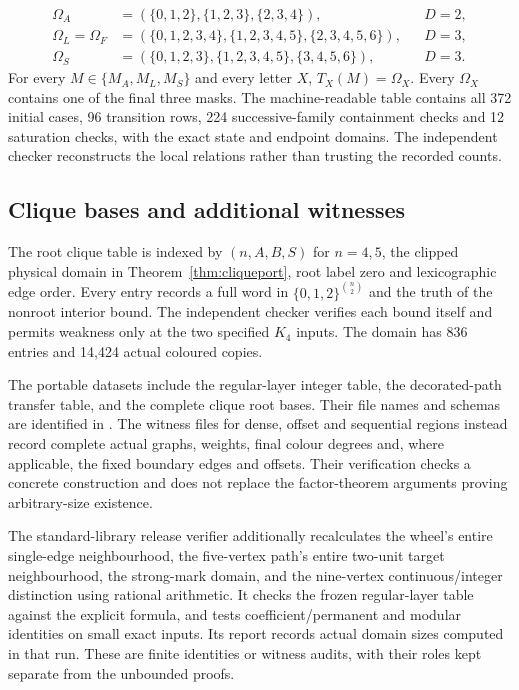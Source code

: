 \begin{align*}
 \Omega_A&=(\{0,1,2\},\{1,2,3\},\{2,3,4\}),&&D=2,\\
 \Omega_L=\Omega_F&=(\{0,1,2,3,4\},\{1,2,3,4,5\},\{2,3,4,5,6\}),&&D=3,\\
 \Omega_S&=(\{0,1,2,3\},\{1,2,3,4,5\},\{3,4,5,6\}),&&D=3.
\end{align*}
For every $M\in\{M_A,M_L,M_S\}$ and every letter $X$,
$T_X(M)=\Omega_X$. Every $\Omega_X$ contains one of the final
three masks. The machine-readable table contains all 372 initial
cases, 96 transition rows, 224 successive-family containment checks
and 12 saturation checks, with the exact state and endpoint domains.
The independent checker reconstructs the local relations rather
than trusting the recorded counts.

\subsection{Clique bases and additional witnesses}

The root clique table is indexed by $(n,A,B,S)$ for $n=4,5$,
the clipped physical domain in Theorem~\ref{thm:cliqueport}, root
label zero and lexicographic edge order. Every entry records a full
word in $\{0,1,2\}^{\binom n2}$ and the truth of the nonroot
interior bound. The independent checker verifies each bound itself
and permits weakness only at the two specified $K_4$ inputs. The
domain has 836 entries and 14,424 actual coloured copies.

The portable datasets include the regular-layer integer table, the
decorated-path transfer table, and the complete clique root bases.
Their file names and schemas are identified in .
The witness files for dense, offset and sequential regions instead
record complete actual graphs, weights, final colour degrees and,
where applicable, the fixed boundary edges and offsets. Their
verification checks a concrete construction and does not replace
the factor-theorem arguments proving arbitrary-size existence.

The standard-library release verifier additionally recalculates the
wheel's entire single-edge neighbourhood, the five-vertex path's
entire two-unit target neighbourhood, the strong-mark domain, and
the nine-vertex continuous/integer distinction using rational
arithmetic. It checks the frozen regular-layer table against the
explicit formula, and tests coefficient/permanent and modular
identities on small exact inputs. Its report records actual domain
sizes computed in that run. These are finite identities or witness
audits, with their roles kept separate from the unbounded proofs.

